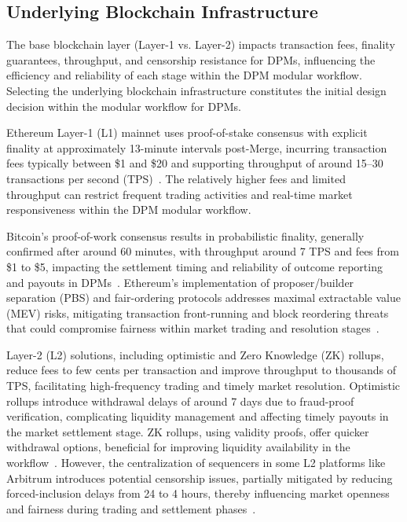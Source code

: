 {\subsection{Underlying Blockchain Infrastructure}\label{subsec:blockchain_infra}
The base blockchain layer (Layer-1 vs. Layer-2) impacts transaction fees, finality guarantees, throughput, and censorship resistance for DPMs, influencing the efficiency and reliability of each stage within the DPM modular workflow. Selecting the underlying blockchain infrastructure constitutes the initial design decision within the modular workflow for DPMs.

Ethereum Layer-1 (L1) mainnet uses proof-of-stake consensus with explicit finality at approximately 13-minute intervals post-Merge, incurring transaction fees typically between \$1 and \$20 and supporting throughput of around 15--30 transactions per second (TPS)~\cite{ClEsGS21}. The relatively higher fees and limited throughput can restrict frequent trading activities and real-time market responsiveness within the DPM modular workflow.

Bitcoin's proof-of-work consensus results in probabilistic finality, generally confirmed after around 60 minutes, with throughput around 7 TPS and fees from \$1 to \$5, impacting the settlement timing and reliability of outcome reporting and payouts in DPMs~\cite{BCFKMN14}. Ethereum's implementation of proposer/builder separation (PBS) and fair-ordering protocols addresses maximal extractable value (MEV) risks, mitigating transaction front-running and block reordering threats that could compromise fairness within market trading and resolution stages~\cite{BBDGJKLZ19}.

Layer-2 (L2) solutions, including optimistic and Zero Knowledge (ZK) rollups, reduce fees to few cents per transaction and improve throughput to thousands of TPS, facilitating high-frequency trading and timely market resolution. Optimistic rollups introduce withdrawal delays of around 7 days due to fraud-proof verification, complicating liquidity management and affecting timely payouts in the market settlement stage. ZK rollups, using validity proofs, offer quicker withdrawal options, beneficial for improving liquidity availability in the workflow~\cite{AKN21}. However, the centralization of sequencers in some L2 platforms like Arbitrum introduces potential censorship issues, partially mitigated by reducing forced-inclusion delays from 24 to 4 hours, thereby influencing market openness and fairness during trading and settlement phases~\cite{BNCD17}.

}
